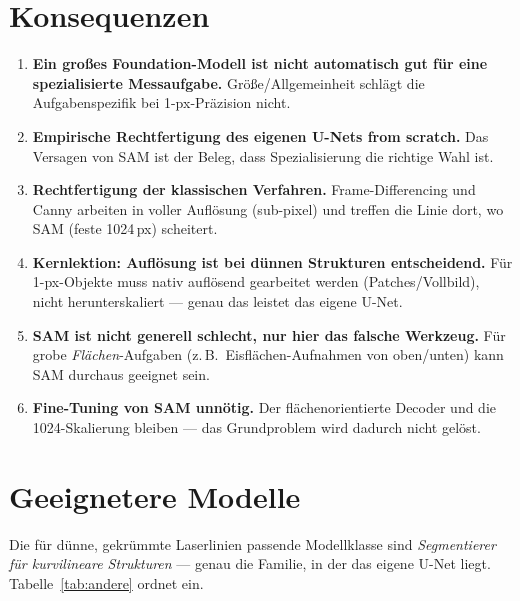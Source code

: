 \documentclass[11pt,a4paper]{article}
\begin{document}
\section{Konsequenzen}
\label{sec:konsequenzen}
\begin{enumerate}
  \item \textbf{Ein großes Foundation-Modell ist nicht automatisch gut für eine
        spezialisierte Messaufgabe.} Größe/Allgemeinheit schlägt die
        Aufgabenspezifik bei 1-px-Präzision nicht.
  \item \textbf{Empirische Rechtfertigung des eigenen U-Nets from scratch.} Das
        Versagen von SAM ist der Beleg, dass Spezialisierung die richtige Wahl ist.
  \item \textbf{Rechtfertigung der klassischen Verfahren.} Frame-Differencing und
        Canny arbeiten in voller Auflösung (sub-pixel) und treffen die Linie dort,
        wo SAM (feste 1024\,px) scheitert.
  \item \textbf{Kernlektion: Auflösung ist bei dünnen Strukturen entscheidend.}
        Für 1-px-Objekte muss nativ auflösend gearbeitet werden (Patches/Vollbild),
        nicht herunterskaliert --- genau das leistet das eigene U-Net.
  \item \textbf{SAM ist nicht generell schlecht, nur hier das falsche Werkzeug.}
        Für grobe \emph{Flächen}-Aufgaben (z.\,B.\ Eisflächen-Aufnahmen von
        oben/unten) kann SAM durchaus geeignet sein.
  \item \textbf{Fine-Tuning von SAM unnötig.} Der flächenorientierte Decoder und die
        1024-Skalierung bleiben --- das Grundproblem wird dadurch nicht gelöst.
\end{enumerate}

\section{Geeignetere Modelle}
\label{sec:andere}
Die für dünne, gekrümmte Laserlinien passende Modellklasse sind
\emph{Segmentierer für kurvilineare Strukturen} --- genau die Familie, in der das
eigene U-Net liegt. Tabelle~\ref{tab:andere} ordnet ein.
\end{document}
